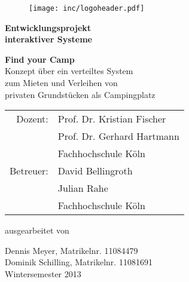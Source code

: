 
\begin{titlepage}

\begin{center}

\begin{figure}[!ht]
	\centering
		\texttt{[image: inc/logoheader.pdf]}
\end{figure}

\vspace{4.0cm}

\begin{Huge}
	\textbf{Entwicklungsprojekt }\\
	\vspace{0.1cm}
	\textbf{interaktiver Systeme}\\
	
\end{Huge}

\vspace{0.8cm}

\begin{LARGE}
	\textbf{Find your Camp}\\
	\vspace{0.2cm}
	Konzept über ein verteiltes System\\
	\vspace{0.1cm}
	zum Mieten und Verleihen von \\
	\vspace{0.1cm}
	privaten Grundstücken als Campingplatz\\
\end{LARGE}

\vspace{2cm}

\begin{tabular}{rl}
        Dozent:  &  Prof. Dr. Kristian Fischer\\
       		 	 &  Prof. Dr. Gerhard Hartmann\\
       			 &  \small Fachhochschule Köln \\[1.0em]
      Betreuer:  &  David Bellingroth\\
				 &  Julian Rahe\\
       			 &  \small Fachhochschule Köln\\
\end{tabular}

\vspace{1.6cm}

\begin{large}
	ausgearbeitet von\\
	\vspace{0.2cm}
\end{large}

\begin{Large}
	Dennis Meyer, Matrikelnr. 11084479\\
	Dominik Schilling, Matrikelnr. 11081691\\
	\vspace{1cm}
	Wintersemester 2013
\end{Large}

\end{center}

\end{titlepage}
